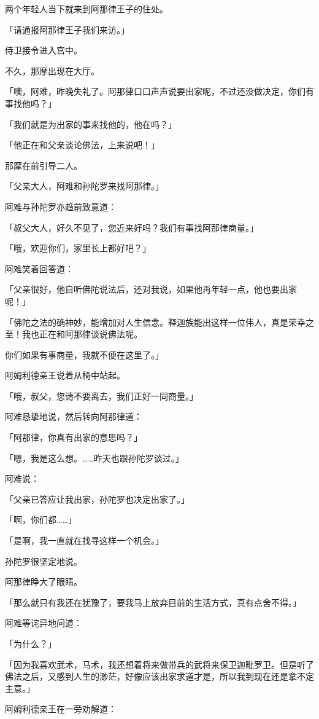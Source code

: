 \documentclass[twoside,openany]{book}
\begin{document}
两个年轻人当下就来到阿那律王子的住处。

「请通报阿那律王子我们来访。」

侍卫接令进入宫中。

不久，那摩出现在大厅。

「噢，阿难，昨晚失礼了。阿那律口口声声说要出家呢，不过还没做决定，你们有事找他吗？」

「我们就是为出家的事来找他的，他在吗？」

「他正在和父亲谈论佛法，上来说吧！」

那摩在前引导二人。

「父亲大人，阿难和孙陀罗来找阿那律。」

阿难与孙陀罗亦趋前致意道：

「叔父大人，好久不见了，您近来好吗？我们有事找阿那律商量。」

「哦，欢迎你们，家里长上都好吧？」

阿难笑着回答道：

「父亲很好，他自听佛陀说法后，还对我说，如果他再年轻一点，他也要出家呢！」

「佛陀之法的确神妙，能增加对人生信念。释迦族能出这样一位伟人，真是荣幸之至！我也正在和阿那律谈说佛法呢。

你们如果有事商量，我就不便在这里了。」

阿姆利德亲王说着从椅中站起。

「哦，叔父，您请不要离去，我们正好一同商量。」

阿难恳挚地说，然后转向阿那律道：

「阿那律，你真有出家的意思吗？」

「嗯，我是这么想。……昨天也跟孙陀罗谈过。」

阿难说：

「父亲已答应让我出家，孙陀罗也决定出家了。」

「啊，你们都……」

「是啊，我一直就在找寻这样一个机会。」

孙陀罗很坚定地说。

阿那律睁大了眼睛。

「那么就只有我还在犹豫了，要我马上放弃目前的生活方式，真有点舍不得。」

阿难等诧异地问道：

「为什么？」

「因为我喜欢武术，马术，我还想着将来做带兵的武将来保卫迦毗罗卫。但是听了佛法之后，又感到人生的渺茫，好像应该出家求道才是，所以我到现在还是拿不定主意。」

阿姆利德亲王在一旁劝解道：
\end{document}
